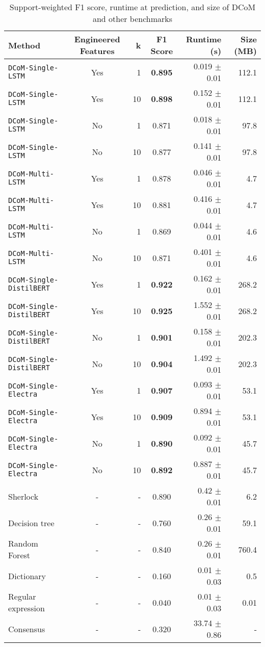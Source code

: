 \documentclass{article}
\begin{document}
\begin{table}[htp]
	\centering
	\begin{tabular}{lcrcrr}
		\hline
		\textbf{Method} & \textbf{Engineered Features} & \textbf{k} & \textbf{F1 Score} & \textbf{Runtime (s)} & \textbf{Size (MB)} \\
		\hline
		 \texttt{DCoM-Single-LSTM} & Yes & 1 & \textbf{0.895} & 0.019 $\pm$ 0.01 & 112.1\\
		 \texttt{DCoM-Single-LSTM} & Yes & 10 & \textbf{0.898} & 0.152 $\pm$ 0.01 & 112.1\\
		 \texttt{DCoM-Single-LSTM} & No & 1 & 0.871 & 0.018 $\pm$ 0.01 & 97.8\\
		 \texttt{DCoM-Single-LSTM} & No & 10 & 0.877 & 0.141 $\pm$ 0.01 & 97.8\\
		 \texttt{DCoM-Multi-LSTM} & Yes & 1 & 0.878 & 0.046 $\pm$ 0.01 & 4.7\\
		 \texttt{DCoM-Multi-LSTM} & Yes & 10 & 0.881 & 0.416 $\pm$ 0.01 & 4.7\\
		 \texttt{DCoM-Multi-LSTM} & No & 1 & 0.869 & 0.044 $\pm$ 0.01 & 4.6\\
		 \texttt{DCoM-Multi-LSTM} & No & 10 & 0.871 & 0.401 $\pm$ 0.01 & 4.6\\
		 \texttt{DCoM-Single-DistilBERT} & Yes & 1 & \textbf{0.922} & 0.162 $\pm$ 0.01 & 268.2\\
		 \texttt{DCoM-Single-DistilBERT} & Yes & 10 & \textbf{0.925} & 1.552 $\pm$ 0.01 & 268.2\\
		 \texttt{DCoM-Single-DistilBERT} & No & 1 & \textbf{0.901} & 0.158 $\pm$ 0.01 & 202.3\\
		 \texttt{DCoM-Single-DistilBERT} & No & 10 & \textbf{0.904} & 1.492 $\pm$ 0.01 & 202.3\\
		 \texttt{DCoM-Single-Electra} & Yes & 1 & \textbf{0.907} & 0.093 $\pm$ 0.01 & 53.1\\
		 \texttt{DCoM-Single-Electra} & Yes & 10 & \textbf{0.909} & 0.894 $\pm$ 0.01 & 53.1\\
		 \texttt{DCoM-Single-Electra} & No & 1 & \textbf{0.890} & 0.092 $\pm$ 0.01 & 45.7\\
		 \texttt{DCoM-Single-Electra} & No & 10 & \textbf{0.892} & 0.887 $\pm$ 0.01 & 45.7\\
		 \hline
		 Sherlock\cite{Hulsebos} & - & - & 0.890 & 0.42 $\pm$ 0.01 & 6.2 \\
		 Decision tree\cite{Hulsebos} & - & - & 0.760 &  0.26 $\pm$ 0.01 &  59.1 \\
		 Random Forest\cite{Hulsebos} & - & - & 0.840 &  0.26 $\pm$ 0.01 &  760.4 \\
		 Dictionary\cite{Hulsebos} & - & - & 0.160 &  0.01 $\pm$ 0.03 &  0.5 \\
		 Regular expression\cite{Hulsebos} & - & - & 0.040 &  0.01 $\pm$ 0.03 &  0.01 \\
		 Consensus\cite{Hulsebos} & - & - & 0.320 &  33.74 $\pm$ 0.86 &  - \\
		\hline
	\end{tabular}
	\caption{Support-weighted F1 score, runtime at prediction, and size of DCoM and other benchmarks}
	\label{tab:results}
\end{table}
\end{document}
